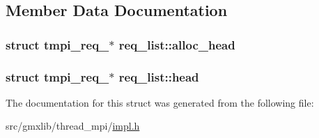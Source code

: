 \subsection{\-Member \-Data \-Documentation}
\hypertarget{structreq__list_a8042936f16edb469a6382b3a988027e4}{
\subsubsection[{alloc\-\_\-head}]{\setlength{\rightskip}{0pt plus 5cm}struct {\bf tmpi\-\_\-req\-\_\-}$\ast$ {\bf req\-\_\-list\-::alloc\-\_\-head}}}\label{structreq__list_a8042936f16edb469a6382b3a988027e4}
\hypertarget{structreq__list_af1fac090221a42d718521115eea764e1}{
\subsubsection[{head}]{\setlength{\rightskip}{0pt plus 5cm}struct {\bf tmpi\-\_\-req\-\_\-}$\ast$ {\bf req\-\_\-list\-::head}}}\label{structreq__list_af1fac090221a42d718521115eea764e1}


\-The documentation for this struct was generated from the following file\-:\begin{DoxyCompactItemize}
\item 
src/gmxlib/thread\-\_\-mpi/\hyperlink{impl_8h}{impl.\-h}\end{DoxyCompactItemize}
